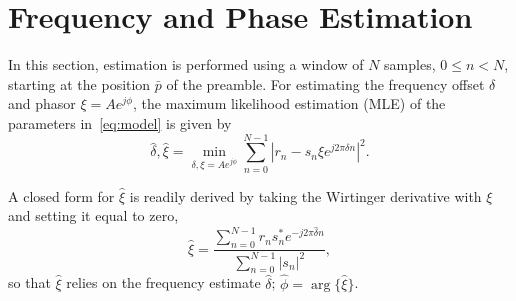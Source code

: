 \section{Frequency and Phase Estimation}%
\label{sec:freq_est}   

In this section, estimation is performed using a window of $N$ samples, $0\leq n<N$, starting
at the position $\bar{p}$ of the preamble.
For estimating the frequency offset $\delta$ and phasor
$\xi=Ae^{j\phi}$, the maximum likelihood estimation (MLE) of the
parameters in~\eqref{eq:model} is given by 
\begin{equation}
  \label{eq:ML_f_xi}
  \hat{\delta},\hat{\xi}=\min_{\delta,\xi=Ae^{j\phi}}\sum_{n=0}^{N-1}|r_n-s_n\xi e^{j2\pi\delta n}|^{2}.
\end{equation}

A closed form for $\hat{\xi}$ is readily derived by taking the
Wirtinger derivative with $\xi$ and setting it equal to zero, 
\begin{equation}
  \label{eq:opt_xi}
  \hat{\xi}=\frac{\sum_{n=0}^{N-1}{r_{n}s_n^{*}e^{-j2\pi\hat{\delta} n}}}{\sum_{n=0}^{N-1}|s_{n}|^2},
\end{equation}
so that $\hat{\xi}$ relies on the frequency estimate $\hat{\delta}$; $\hat{\phi}=\arg\{\hat{\xi}\}$. 


